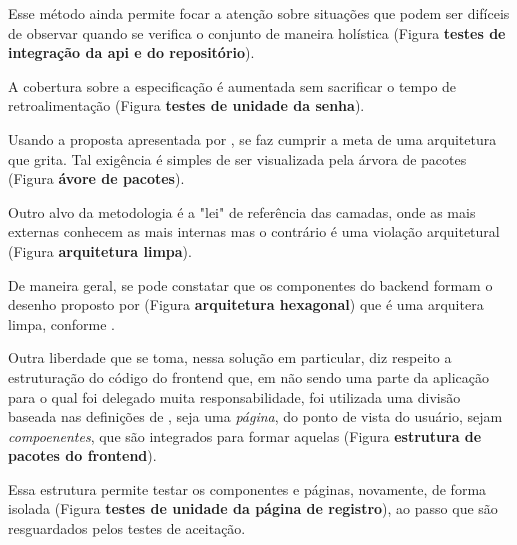   Esse método ainda permite focar a atenção sobre situações que podem ser difíceis de observar quando se verifica o conjunto de maneira holística (Figura \textbf{testes de integração da api e do repositório}).

  A cobertura sobre a especificação é aumentada sem sacrificar o tempo de retroalimentação (Figura \textbf{testes de unidade da senha}).

  Usando a proposta apresentada por , se faz cumprir a meta de uma arquitetura que grita. Tal exigência é simples de ser visualizada pela árvora de pacotes (Figura \textbf{ávore de pacotes}).

  Outro alvo da metodologia é a "lei" de referência das camadas, onde as mais externas conhecem as mais internas mas o contrário é uma violação arquitetural (Figura \textbf{arquitetura limpa}).

  De maneira geral, se pode constatar que os componentes do backend formam o desenho proposto por  (Figura \textbf{arquitetura hexagonal}) que é uma arquitera limpa, conforme .

  Outra liberdade que se toma, nessa solução em particular, diz respeito a estruturação do código do frontend que, em não sendo uma parte da aplicação para o qual foi delegado muita responsabilidade, foi utilizada uma divisão baseada nas definições de , seja uma \emph{página}, do ponto de vista do usuário, sejam \emph{compoenentes}, que são integrados para formar aquelas (Figura \textbf{estrutura de pacotes do frontend}).

  Essa estrutura permite testar os componentes e páginas, novamente, de forma isolada (Figura \textbf{testes de unidade da página de registro}), ao passo que são resguardados pelos testes de aceitação.
